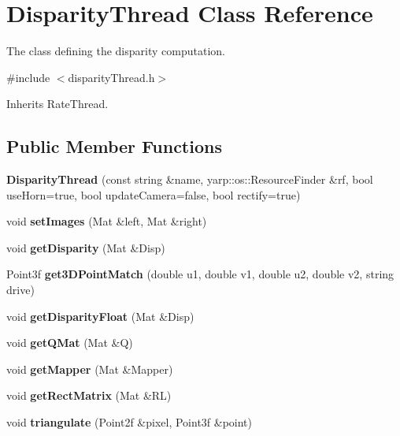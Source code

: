 \section{Disparity\+Thread Class Reference}
\label{classDisparityThread}


The class defining the disparity computation.  




{\ttfamily \#include $<$disparity\+Thread.\+h$>$}



Inherits Rate\+Thread.

\subsection*{Public Member Functions}
\begin{DoxyCompactItemize}
\item 
\mbox{\label{classDisparityThread_ab53d3046d1397fb7c0eef512e1aae683}} 
{\bfseries Disparity\+Thread} (const string \&name, yarp\+::os\+::\+Resource\+Finder \&rf, bool use\+Horn=true, bool update\+Camera=false, bool rectify=true)
\item 
\mbox{\label{classDisparityThread_a91ce8f5117613ee0863fa21b0f1347b4}} 
void {\bfseries set\+Images} (Mat \&left, Mat \&right)
\item 
\mbox{\label{classDisparityThread_a9d7c5ff0ddc84fbc74f78e6bc77c8297}} 
void {\bfseries get\+Disparity} (Mat \&Disp)
\item 
\mbox{\label{classDisparityThread_ae499c13ea55662aa612781d0d7488741}} 
Point3f {\bfseries get3\+D\+Point\+Match} (double u1, double v1, double u2, double v2, string drive)
\item 
\mbox{\label{classDisparityThread_aadcaf0193ce0c9418392803c77725efc}} 
void {\bfseries get\+Disparity\+Float} (Mat \&Disp)
\item 
\mbox{\label{classDisparityThread_a0c5d331cc596e81ba9bfb67770a67fa7}} 
void {\bfseries get\+Q\+Mat} (Mat \&Q)
\item 
\mbox{\label{classDisparityThread_af7d1aee791ada6fdf79be8bf8e40e260}} 
void {\bfseries get\+Mapper} (Mat \&Mapper)
\item 
\mbox{\label{classDisparityThread_a0c0b139ecaf7fa43a63ce6610c184288}} 
void {\bfseries get\+Rect\+Matrix} (Mat \&RL)
\item 
\mbox{\label{classDisparityThread_a9f132e68856b56d0dded0f1435d1f34c}} 
void {\bfseries triangulate} (Point2f \&pixel, Point3f \&point)
\item 

\end{DoxyCompactItemize}
